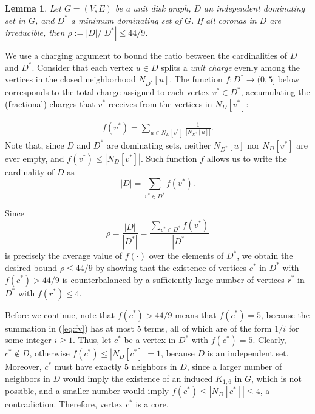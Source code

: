 \documentclass[preprint,12pt]{elsarticle}
\newtheorem{lem}[thm]{Lemma}
\begin{document}
\begin{lem} \label{l:irreducible}
Let $G = (V,E)$ be a unit disk graph, $D$ an independent dominating set in $G$, and $D^*$ a minimum dominating set of $G$. If all coronas in $D$ are irreducible, then $\rho := |D|/|D^*| \leq 44/9$.
\end{lem}
\begin{pf}We use a charging argument to bound the ratio between the cardinalities of $D$ and $D^*$. Consider that each vertex $u \in D$ splits a \emph{unit charge} evenly among the vertices in the closed neighborhood $N_{D^*}[u]$. The function ${f : D^* \to (0,5]}$ below corresponds to the total charge assigned to each vertex $v^* \in D^*$, accumulating the (fractional) charges that $v^*$ receives from the vertices in $N_D[v^*]$:

\begin{eqnarray}\label{eq:fv}
f(v^*) = \sum_{u \in N_D[v^*]} \frac{1}{\left|N_{D^*}[u]\right|}.
\end{eqnarray}
Note that, since $D$ and $D^*$ are dominating sets, neither $N_{D^*}[u]$ nor $N_{D}[v^*]$ are ever empty, and $f(v^*) \leq |N_D[v^*]|$. Such function $f$ allows us to write the cardinality of $D$ as
$$|D| = \sum_{v^* \in D^*} f(v^*).$$

Since
$$\rho = \frac{|D|}{|D^*|} = \frac{\sum_{v^* \in D^*} f(v^*)}{|D^*|}$$
is precisely the average value of $f(\cdot)$ over the elements of $D^*$, we obtain the desired bound $\rho \leq 44/9$ by showing that the existence of vertices $c^*$ \linebreak in $D^*$ with $f(c^*) > 44/9$ is counterbalanced by a sufficiently large number of vertices $r^*$ in $D^*$ with $f(r^*) \leq 4$.

Before we continue, note that $f(c^*) > 44/9$ means that $f(c^*) = 5$, because the summation in (\ref{eq:fv}) has at most $5$ terms, all of which are of the form $1/i$ for some integer $i \geq 1$.
Thus, let $c^*$ be a vertex in $D^*$ with $f(c^*) = 5$. Clearly, $c^* \notin D$, otherwise $f(c^*) \leq |N_D[c^*]| = 1$, because $D$ is an independent set. Moreover, $c^*$ must have exactly $5$ neighbors in $D$, since a larger number of neighbors in $D$ would imply the existence of an induced $K_{1,6}$ in $G$, which is not possible, and a smaller number would imply $f(c^*) \leq |N_D[c^*]| \leq 4$, a contradiction. Therefore, vertex $c^*$ is a core.


\end{pf}
\end{document}
